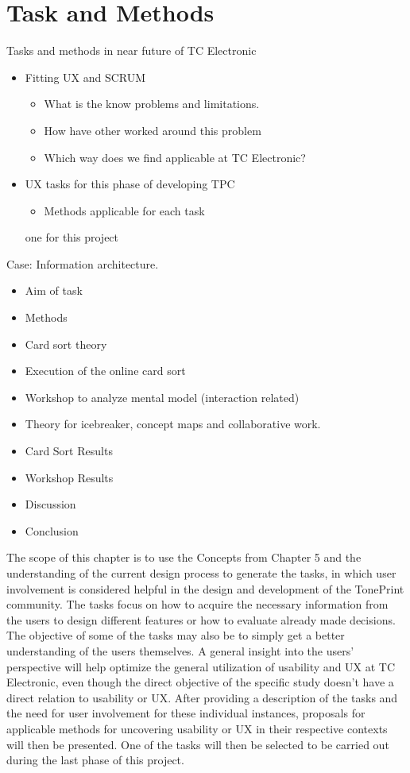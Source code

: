 \chapter{Task and Methods}
\label{TaskAndMethods}

Tasks and methods in near future of TC Electronic
\begin{itemize}
	\item Fitting UX and SCRUM
		\begin{itemize}
			\item What is the know problems and limitations.
			\item How have other worked around this problem
			\item Which way does we find applicable at TC Electronic?
		\end{itemize}
	\item UX tasks for this phase of developing TPC
		\begin{itemize}
			\item Methods applicable for each task
		\end{itemize}
	\itemChoosing one for this project
\end{itemize}

Case: Information architecture.
\begin{itemize}
	\item Aim of task
	\item Methods
	\item Card sort theory
	\item Execution of the online card sort
	\item Workshop to analyze mental model (interaction related)
	\item Theory for icebreaker, concept maps and collaborative work.
	\item Card Sort Results
	\item Workshop Results
	\item Discussion
	\item Conclusion
\end{itemize}



\noindent
The scope of this chapter is to use the Concepts from Chapter 5 and the understanding of the current design process to generate the tasks, in which user involvement is considered helpful in the design and development of the TonePrint community. The tasks focus on how to acquire the necessary information from the users to design different features or how to evaluate already made decisions. The objective of some of the tasks may also be to simply get a better understanding of the users themselves. A general insight into the users' perspective will help optimize the general utilization of usability and UX at TC Electronic, even though the direct objective of the specific study doesn't have a direct relation to usability or UX. After providing a description of the tasks and the need for user involvement for these individual instances, proposals for applicable methods for uncovering usability or UX in their respective contexts will then be presented. One of the tasks will then be selected to be carried out during the last phase of this project.

